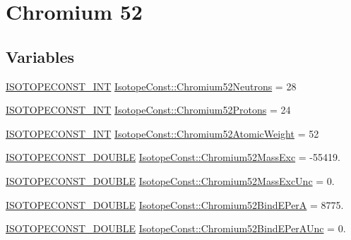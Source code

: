 \hypertarget{group___isotope_const-_chromium-_cr52}{}\section{Chromium 52}
\label{group___isotope_const-_chromium-_cr52}
\subsection*{Variables}
\begin{DoxyCompactItemize}
\item 
\mbox{\hyperlink{group___isotope_const-_macros_ga5f18360b3e99483a35c32d789e62621c}{I\+S\+O\+T\+O\+P\+E\+C\+O\+N\+S\+T\+\_\+\+I\+NT}} \mbox{\hyperlink{group___isotope_const-_chromium-_cr52_gaf33764b08e0cec3f599aac2df3094f99}{Isotope\+Const\+::\+Chromium52\+Neutrons}} = 28
\item 
\mbox{\hyperlink{group___isotope_const-_macros_ga5f18360b3e99483a35c32d789e62621c}{I\+S\+O\+T\+O\+P\+E\+C\+O\+N\+S\+T\+\_\+\+I\+NT}} \mbox{\hyperlink{group___isotope_const-_chromium-_cr52_ga8610ff7f0199cfe9be46398785f014e5}{Isotope\+Const\+::\+Chromium52\+Protons}} = 24
\item 
\mbox{\hyperlink{group___isotope_const-_macros_ga5f18360b3e99483a35c32d789e62621c}{I\+S\+O\+T\+O\+P\+E\+C\+O\+N\+S\+T\+\_\+\+I\+NT}} \mbox{\hyperlink{group___isotope_const-_chromium-_cr52_ga67f6a2517353c0f87dae73e19a32bc8f}{Isotope\+Const\+::\+Chromium52\+Atomic\+Weight}} = 52
\item 
\mbox{\hyperlink{group___isotope_const-_macros_ga8f45a7272ce02c0b4c65c44636ed719a}{I\+S\+O\+T\+O\+P\+E\+C\+O\+N\+S\+T\+\_\+\+D\+O\+U\+B\+LE}} \mbox{\hyperlink{group___isotope_const-_chromium-_cr52_ga9cc565d21300d0b987e87ff3fc71f235}{Isotope\+Const\+::\+Chromium52\+Mass\+Exc}} = -\/55419.
\item 
\mbox{\hyperlink{group___isotope_const-_macros_ga8f45a7272ce02c0b4c65c44636ed719a}{I\+S\+O\+T\+O\+P\+E\+C\+O\+N\+S\+T\+\_\+\+D\+O\+U\+B\+LE}} \mbox{\hyperlink{group___isotope_const-_chromium-_cr52_ga61ef3726c649eb5f5a54c8acfb066157}{Isotope\+Const\+::\+Chromium52\+Mass\+Exc\+Unc}} = 0.
\item 
\mbox{\hyperlink{group___isotope_const-_macros_ga8f45a7272ce02c0b4c65c44636ed719a}{I\+S\+O\+T\+O\+P\+E\+C\+O\+N\+S\+T\+\_\+\+D\+O\+U\+B\+LE}} \mbox{\hyperlink{group___isotope_const-_chromium-_cr52_gab367f8aeddb3a67e535e53a4ea13e638}{Isotope\+Const\+::\+Chromium52\+Bind\+E\+PerA}} = 8775.
\item 
\mbox{\hyperlink{group___isotope_const-_macros_ga8f45a7272ce02c0b4c65c44636ed719a}{I\+S\+O\+T\+O\+P\+E\+C\+O\+N\+S\+T\+\_\+\+D\+O\+U\+B\+LE}} \mbox{\hyperlink{group___isotope_const-_chromium-_cr52_ga4c9f9a03355083f5dcc784a52089da26}{Isotope\+Const\+::\+Chromium52\+Bind\+E\+Per\+A\+Unc}} = 0.

\end{DoxyCompactItemize}

